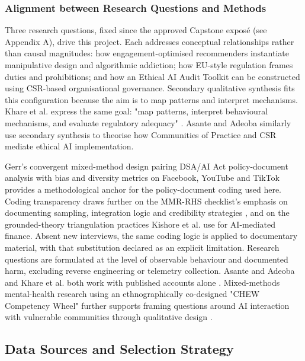 \documentclass[11pt]{article}
\begin{document}
\subsubsection{Alignment between Research Questions and Methods}
\label{sec:alignment_rq_methods} Three research questions, fixed since the approved Capstone exposé (see Appendix A), drive this project. Each addresses conceptual relationships rather than causal magnitudes: how engagement-optimised recommenders instantiate manipulative design and algorithmic addiction; how EU-style regulation frames duties and prohibitions; and how an Ethical AI Audit Toolkit can be constructed using CSR-based organisational governance. Secondary qualitative synthesis fits this configuration because the aim is to map patterns and interpret mechanisms. Khare et al. express the same goal: "map patterns, interpret behavioural mechanisms, and evaluate regulatory adequacy" \parencites[6]{6295677}. Asante and Adeoba similarly use secondary synthesis \parencites[8]{8200246}[10]{8200246} to theorise how Communities of Practice and CSR mediate ethical AI implementation.

Gerr's convergent mixed-method design pairing DSA/AI Act policy-document analysis with bias and diversity metrics on Facebook, YouTube and TikTok \parencites[3]{5142478} provides a methodological anchor for the policy-document coding used here. Coding transparency draws further on the MMR-RHS checklist's emphasis on documenting sampling, integration logic and credibility strategies \parencites[2]{8591813}, and on the grounded-theory triangulation practices Kishore et al. \parencites[6]{4245543} use for AI-mediated finance. Absent new interviews, the same coding logic is applied to documentary material, with that substitution declared as an explicit limitation. Research questions are formulated at the level of observable behaviour and documented harm, excluding reverse engineering or telemetry collection. Asante and Adeoba and Khare et al. both work with published accounts alone \parencites[11]{8200246}[6]{6295677}. Mixed-methods mental-health research using an ethnographically co-designed "CHEW Competency Wheel" \parencites[4]{5419804} further supports framing questions around AI interaction with vulnerable communities through qualitative design \parencites[6]{6295677}[8]{8200246}.

\subsection{Data Sources and Selection Strategy}
\end{document}

